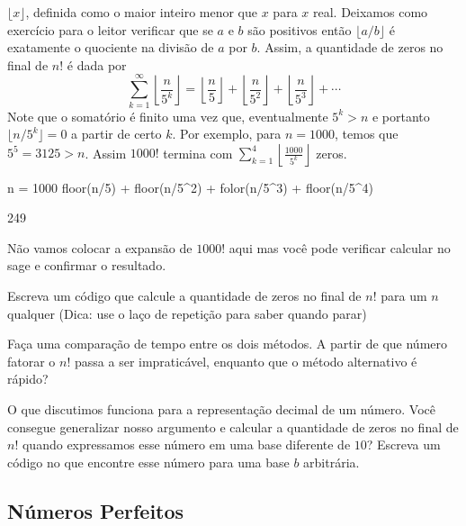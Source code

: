 $\lfloor x\rfloor$, definida como o maior inteiro menor que $x$ para
$x$ real. Deixamos como exercício para o leitor verificar que
se $a$ e $b$ são positivos então $\lfloor a/b \rfloor$ é exatamente
o quociente na divisão de $a$ por $b$. Assim, a
quantidade de zeros no final de $n!$ é dada por
$$
\sum_{k = 1}^\infty \left\lfloor{\frac{n}{5^k}}\right\rfloor = 
  \left\lfloor{\frac{n}{5}}\right\rfloor
  + \left\lfloor{\frac{n}{5^2}}\right\rfloor
  + \left\lfloor{\frac{n}{5^3}}\right\rfloor
  + \cdots
$$
Note que o somatório é finito uma vez que, eventualmente $5^k > n$
e portanto $\lfloor n / 5^k \rfloor = 0$ a partir de certo $k$.
Por exemplo, para $n = 1000$,  temos que $5^5 = 3125 > n$. Assim
$1000!$ termina com 
$\sum_{k = 1}^4 \left\lfloor{\frac{1000}{5^k}}\right\rfloor$ zeros.
\begin{sageinput}
n = 1000
floor(n/5) + floor(n/5^2) + folor(n/5^3) + floor(n/5^4)
\end{sageinput}
\begin{sageoutput}
249
\end{sageoutput}

Não vamos colocar a expansão de $1000!$ aqui mas você pode
verificar calcular no sage e confirmar o resultado.

\begin{exercise}
  Escreva um código que calcule a quantidade de zeros no final de $n!$
  para um $n$ qualquer (Dica: use o laço de repetição  para
  saber quando parar)
\end{exercise}

\begin{exercise}
  Faça uma comparação de tempo entre os dois métodos. A partir de
  que número fatorar o $n!$ passa a ser impraticável, enquanto
  que o método alternativo é rápido?
\end{exercise}

\begin{exercise}
  [Desafio] O que discutimos funciona para a representação
  decimal de um número. Você consegue generalizar nosso argumento
  e calcular a quantidade de zeros no final de $n!$ quando
  expressamos esse número em uma base diferente de $10$? Escreva
  um código no \Sage que encontre esse número para uma
  base $b$ arbitrária.
\end{exercise}

\subsection{Números Perfeitos}

